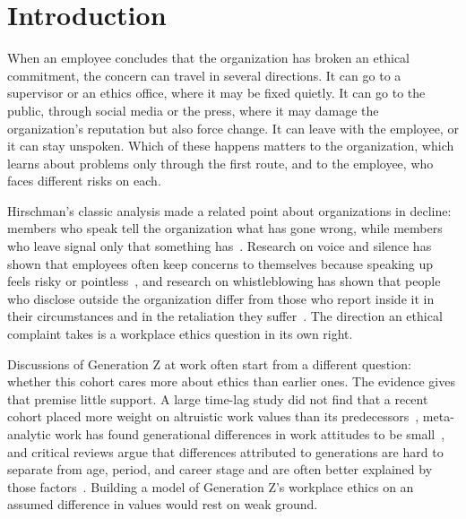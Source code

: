 \section{Introduction}
When an employee concludes that the organization has broken an ethical commitment, the concern can travel in several directions. It can go to a supervisor or an ethics office, where it may be fixed quietly. It can go to the public, through social media or the press, where it may damage the organization's reputation but also force change. It can leave with the employee, or it can stay unspoken. Which of these happens matters to the organization, which learns about problems only through the first route, and to the employee, who faces different risks on each.

Hirschman's classic analysis made a related point about organizations in decline: members who speak tell the organization what has gone wrong, while members who leave signal only that something has~\citep{hirschman1970exit}. Research on voice and silence has shown that employees often keep concerns to themselves because speaking up feels risky or pointless~\citep{morrison2000organizational,milliken2003exploratory}, and research on whistleblowing has shown that people who disclose outside the organization differ from those who report inside it in their circumstances and in the retaliation they suffer~\citep{dworkin1998internal}. The direction an ethical complaint takes is a workplace ethics question in its own right.

Discussions of Generation Z at work often start from a different question: whether this cohort cares more about ethics than earlier ones. The evidence gives that premise little support. A large time-lag study did not find that a recent cohort placed more weight on altruistic work values than its predecessors~\citep{twenge2010generational}, meta-analytic work has found generational differences in work attitudes to be small~\citep{costanza2012generational}, and critical reviews argue that differences attributed to generations are hard to separate from age, period, and career stage and are often better explained by those factors~\citep{lyons2014generational,rudolph2021generations}. Building a model of Generation Z's workplace ethics on an assumed difference in values would rest on weak ground.

